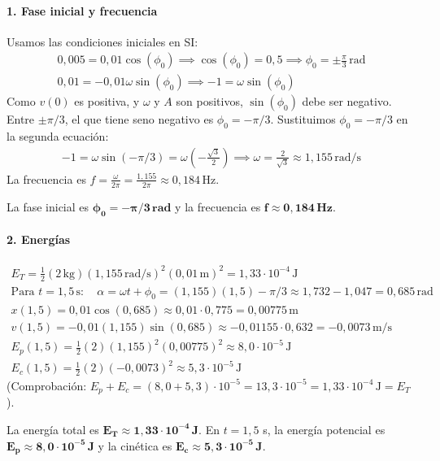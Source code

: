 \paragraph{1. Fase inicial y frecuencia}
Usamos las condiciones iniciales en SI:
\begin{gather}
    0,005 = 0,01 \cos(\phi_0) \implies \cos(\phi_0) = 0,5 \implies \phi_0 = \pm \frac{\pi}{3} \, \text{rad} \\
    0,01 = -0,01 \omega \sin(\phi_0) \implies -1 = \omega \sin(\phi_0)
\end{gather}
Como $v(0)$ es positiva, y $\omega$ y $A$ son positivos, $\sin(\phi_0)$ debe ser negativo. Entre $\pm \pi/3$, el que tiene seno negativo es $\phi_0 = -\pi/3$.
Sustituimos $\phi_0 = -\pi/3$ en la segunda ecuación:
\begin{gather}
    -1 = \omega \sin(-\pi/3) = \omega \left(-\frac{\sqrt{3}}{2}\right) \implies \omega = \frac{2}{\sqrt{3}} \approx 1,155 \, \text{rad/s}
\end{gather}
La frecuencia es $f = \frac{\omega}{2\pi} = \frac{1,155}{2\pi} \approx 0,184 \, \text{Hz}$.
\begin{cajaresultado}
La fase inicial es $\boldsymbol{\phi_0=-\pi/3\,\textbf{rad}}$ y la frecuencia es $\boldsymbol{f \approx 0,184\,\textbf{Hz}}$.
\end{cajaresultado}
\paragraph{2. Energías}
\begin{gather}
    E_T = \frac{1}{2}(2\,\text{kg})(1,155\,\text{rad/s})^2(0,01\,\text{m})^2 = 1,33 \cdot 10^{-4}\,\text{J} \\
    \text{Para } t=1,5\,\text{s}: \quad \alpha = \omega t + \phi_0 = (1,155)(1,5) - \pi/3 \approx 1,732 - 1,047 = 0,685\,\text{rad} \\
    x(1,5) = 0,01 \cos(0,685) \approx 0,01 \cdot 0,775 = 0,00775\,\text{m} \\
    v(1,5) = -0,01(1,155)\sin(0,685) \approx -0,01155 \cdot 0,632 = -0,0073\,\text{m/s} \\
    E_p(1,5) = \frac{1}{2}(2)(1,155)^2(0,00775)^2 \approx 8,0 \cdot 10^{-5}\,\text{J} \\
    E_c(1,5) = \frac{1}{2}(2)(-0,0073)^2 \approx 5,3 \cdot 10^{-5}\,\text{J}
\end{gather}
(Comprobación: $E_p+E_c = (8,0+5,3)\cdot 10^{-5} = 13,3 \cdot 10^{-5} = 1,33 \cdot 10^{-4}\,\text{J} = E_T$).
\begin{cajaresultado}
La energía total es $\boldsymbol{E_T \approx 1,33 \cdot 10^{-4}\,\textbf{J}}$. En $t=1,5$ s, la energía potencial es $\boldsymbol{E_p \approx 8,0 \cdot 10^{-5}\,\textbf{J}}$ y la cinética es $\boldsymbol{E_c \approx 5,3 \cdot 10^{-5}\,\textbf{J}}$.
\end{cajaresultado}

